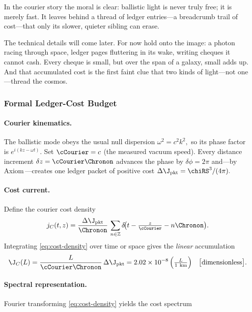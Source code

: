 \documentclass[11pt,oneside]{book}
\begin{document}
{In the courier story the moral is clear:  
ballistic light is never truly free; it is merely fast.  
It leaves behind a thread of ledger entries—a breadcrumb trail of
cost—that only its slower, quieter sibling can erase.  

The technical details will come later.  For now hold onto the image:
a photon racing through space, ledger pages fluttering in its wake,
writing cheques it cannot cash.  Every cheque is small, but over the
span of a galaxy, small adds up.  And that accumulated cost is the
first faint clue that two kinds of light—not one—thread the cosmos.


\subsubsection*{Formal Ledger-Cost Budget}

\paragraph{Courier kinematics.}
The ballistic mode obeys the usual null dispersion
\(
   \omega^{2}=c^{2}k^{2},
\)
so its phase factor is
\(
   e^{i(kz-\omega t)}.
\)
Set \(\cCourier=c\) (the measured vacuum speed).  Every distance
increment
\(
   \delta z=\cCourier\Chronon
\)
advances the phase by
\(
   \delta\phi=2\pi
\)
and—by Axiom\,—creates one ledger packet of positive cost
\(
   \Delta\J_{\text{pkt}}=\chiRS^{3}/(4\pi).
\)

\paragraph{Cost current.}
Define the courier cost density
\[
   j_{C}(t,z)
   =
   \frac{\Delta\J_{\text{pkt}}}{\Chronon}\,
   \sum_{n\in\mathbb Z}
   \delta\!\bigl(t-\tfrac{z}{\cCourier}-n\Chronon\bigr).
   \label{eq:cost-density}
\]
Integrating \eqref{eq:cost-density} over time or space gives the
\emph{linear} accumulation
\[
   \J_{C}(L)
   =
   \frac{L}{\cCourier\Chronon}\,\Delta\J_{\text{pkt}}
   =
   2.02\times10^{-8}\,
   \Bigl(\tfrac{L}{1\ \text{km}}\Bigr)
   \quad\bigl[\text{dimensionless}\bigr].
   \label{eq:Jc}
\]

\paragraph{Spectral representation.}
Fourier transforming \eqref{eq:cost-density} yields the cost spectrum

}
\end{document}
